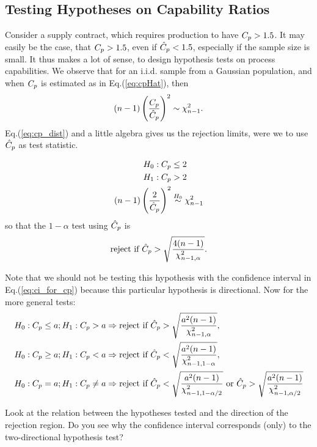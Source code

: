 \subsection{Testing Hypotheses on Capability Ratios}
Consider a supply contract, which requires production to have $C_p>1.5$. 
It may easily be the case, that $C_p>1.5$, even if $\hat{C}_p<1.5$, especially if the sample size is small.
It thus makes a lot of sense, to design hypothesis tests on process capabilities. 
We observe that for an i.i.d. sample from a Gaussian population, and when $C_p$ is estimated as in Eq.(\ref{eq:cpHat}), then
\begin{align}
\label{eq:cp_dist}
	(n-1) \left( \frac{C_p}{\hat{C}_p} \right)^2  \sim \chi^2_{n-1}.
\end{align} 
Eq.(\ref{eq:cp_dist}) and a little algebra gives us the rejection limits, were we to use $\hat{C}_p$ as test statistic.

\begin{example}
\begin{align*}
	H_0: C_p &\leq 2	\\
	H_1:C_p &> 2 \\
	(n-1) \left( \frac{2}{\hat{C}_p} \right)^2  &\overset{H_0}{\sim} \chi^2_{n-1}
\end{align*}
so that the $1-\alpha$ test using $\hat{C}_p$ is 
\begin{align*}
	\text{reject if } \hat{C}_p > \sqrt{\frac{4 (n-1)}{\chi^2_{n-1,\alpha}}} .
\end{align*}
\end{example}
Note that we should not be testing this hypothesis with the confidence interval in Eq.(\ref{eq:ci_for_cp}) because this particular hypothesis is directional.
Now for the more general tests:
\begin{align*}
	H_0: C_p \leq a; 
	H_1:C_p > a 
	&\Rightarrow \text{reject if } \hat{C}_p > \sqrt{\frac{a^2 (n-1)}{\chi^2_{n-1,\alpha}}},\\
	H_0: C_p \geq  a; 
	H_1:C_p < a 
	&\Rightarrow \text{reject if } \hat{C}_p < \sqrt{\frac{a^2 (n-1)}{\chi^2_{n-1,1-\alpha}}}, \\
	H_0: C_p =  a; 
	H_1:C_p \neq a 
	&\Rightarrow \text{reject if } \hat{C}_p < \sqrt{\frac{a^2 (n-1)}{\chi^2_{n-1,1-\alpha/2}}}
	\text{ or } \hat{C}_p > \sqrt{\frac{a^2 (n-1)}{\chi^2_{n-1,\alpha/2}}} \\
\end{align*}


\begin{think}
Look at the relation between the hypotheses tested and the direction of the rejection region.
Do you see why the confidence interval corresponds (only) to the two-directional hypothesis test?
\end{think}





